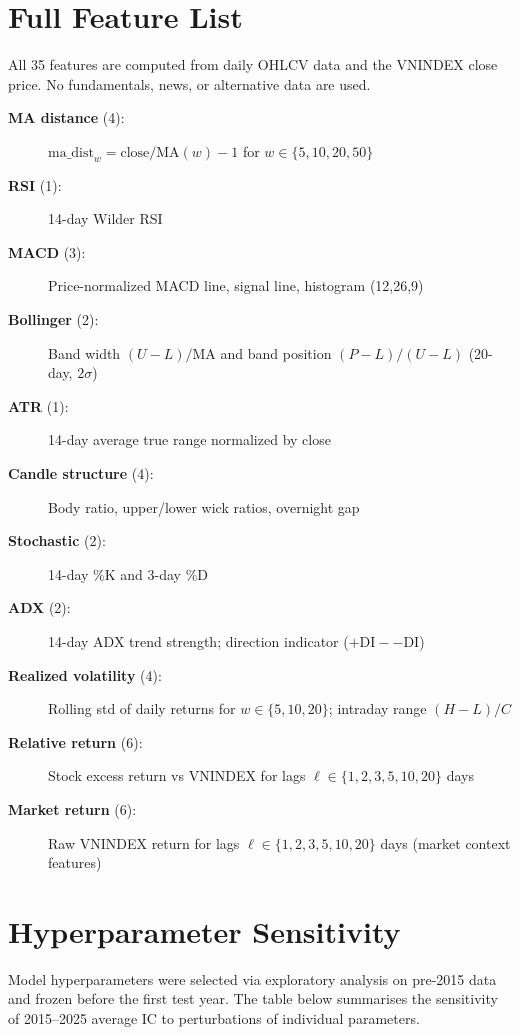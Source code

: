 \documentclass[12pt,a4paper]{article}
\begin{document}
\appendix

\section{Full Feature List}
\label{app:features}

All 35 features are computed from daily OHLCV data and the VNINDEX close price.
No fundamentals, news, or alternative data are used.

\begin{description}
  \item[\textbf{MA distance} (4):] $\text{ma\_dist}_{w} = \text{close}/\text{MA}(w) - 1$
       for $w \in \{5, 10, 20, 50\}$
  \item[\textbf{RSI} (1):] 14-day Wilder RSI
  \item[\textbf{MACD} (3):] Price-normalized MACD line, signal line, histogram (12,26,9)
  \item[\textbf{Bollinger} (2):] Band width $(U-L)/\text{MA}$ and band position
       $(P-L)/(U-L)$ (20-day, $2\sigma$)
  \item[\textbf{ATR} (1):] 14-day average true range normalized by close
  \item[\textbf{Candle structure} (4):] Body ratio, upper/lower wick ratios, overnight gap
  \item[\textbf{Stochastic} (2):] 14-day \%K and 3-day \%D
  \item[\textbf{ADX} (2):] 14-day ADX trend strength; direction indicator
       ($+\text{DI} - {-}\text{DI}$)
  \item[\textbf{Realized volatility} (4):] Rolling std of daily returns for
       $w \in \{5,10,20\}$; intraday range $(H-L)/C$
  \item[\textbf{Relative return} (6):] Stock excess return vs VNINDEX for lags
       $\ell \in \{1, 2, 3, 5, 10, 20\}$ days
  \item[\textbf{Market return} (6):] Raw VNINDEX return for lags
       $\ell \in \{1, 2, 3, 5, 10, 20\}$ days (market context features)
\end{description}

\section{Hyperparameter Sensitivity}
\label{app:hyperparams}

Model hyperparameters were selected via exploratory analysis on pre-2015 data and
frozen before the first test year. The table below summarises the sensitivity of
2015--2025 average IC to perturbations of individual parameters.
\end{document}
